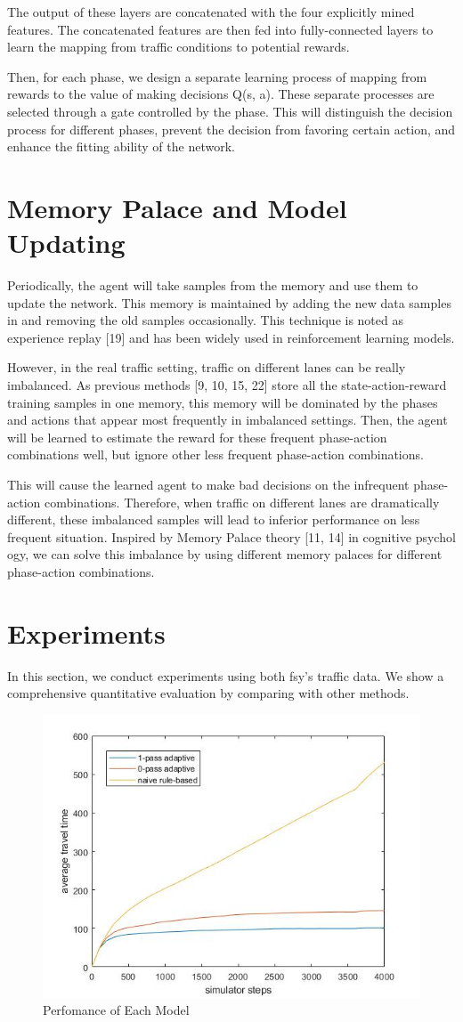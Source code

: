 \documentclass{article}
\begin{document}
The output of these
layers are concatenated with the four explicitly mined features. 
The concatenated features are then fed into
fully-connected layers to learn the mapping from traffic conditions
to potential rewards.

Then, for each phase, we design a separate
learning process of mapping from rewards to the value of making
decisions Q(s, a). These separate processes are selected through a
gate controlled by the phase.  This will distinguish the decision
process for different phases, prevent the decision from favoring
certain action, and enhance the fitting ability of the network.

\section{Memory Palace and Model Updating}

\quad Periodically, the agent will take samples from the memory and use
them to update the network. This memory is maintained by adding
the new data samples in and removing the old samples occasionally.
This technique is noted as experience replay [19] and has been
widely used in reinforcement learning models.

However, in the real traffic setting, traffic on different lanes can
be really imbalanced. As previous methods [9, 10, 15, 22] store all the
state-action-reward training samples in one memory, this memory
will be dominated by the phases and actions that appear most
frequently in imbalanced settings. Then, the agent will be learned to
estimate the reward for these frequent phase-action combinations
well, but ignore other less frequent phase-action combinations.

This will cause the learned agent to make bad decisions on the
infrequent phase-action combinations. Therefore, when traffic on
different lanes are dramatically different, these imbalanced samples
will lead to inferior performance on less frequent situation.
Inspired by Memory Palace theory [11, 14] in cognitive psychol
ogy, we can solve this imbalance by using different memory palaces
for different phase-action combinations. 


\section{Experiments}
\quad In this section, we conduct experiments using both fsy's traffic data. We show a comprehensive quantitative evaluation by comparing with other methods.
\begin{figure}[H]
\centering
\includegraphics[width=.4\textwidth]{pass.jpg}
\caption{Perfomance of Each Model}
\end{figure}
\end{document}
